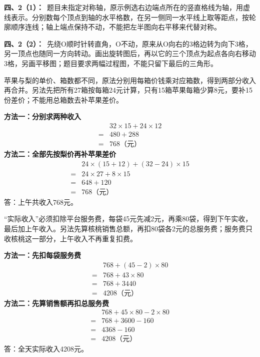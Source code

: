 \documentclass[multi=snippet,border=0pt]{standalone}
\newenvironment{snippet}[3]{\begin{minipage}{#1bp}\color{answerred}\fontsize{#2}{#3}\selectfont\raggedright}{\end{minipage}}
\begin{document}
\begin{snippet}{505}{11.5}{14}\textbf{四、2（1）：}\ 题目未指定对称轴，原示例选右边端点所在的竖直格线为轴，用虚线表示。分别数每个顶点到轴的水平格数，在另一侧同一水平线上取等距点，按轮廓顺序连线；轴上端点保持不动，不能把左半图向右平移来代替对称。\end{snippet}
\begin{snippet}{505}{11.5}{14}\textbf{四、2（2）：}\ 先绕O顺时针转直角，O不动，原来从O向右的3格边转为向下3格，另一顶点也随同一方向转动。画出旋转图后，再以它的三个顶点为起点各向右移动3格，另画平移图；题目要求两幅过程图，不能只留下最后的三角形。\end{snippet}
\begin{snippet}{505}{11.5}{14}苹果与梨的单价、箱数都不同，原法分别用每箱价钱乘对应箱数，得到两部分收入再合并。另法先把所有27箱按每箱24元计算，只有15箱苹果每箱少算8元，要补15份差价；不能用总箱数去补苹果差价。\par \textbf{方法一：分别求两种收入}\[\begin{aligned} &32\times15+24\times12\\={}&480+288\\={}&768\text{（元）}\end{aligned}\]\textbf{方法二：全部先按梨价再补苹果差价}\[\begin{aligned} &24\times(15+12)+(32-24)\times15\\={}&24\times27+8\times15\\={}&648+120\\={}&768\text{（元）}\end{aligned}\]答：上午共收入768元。\end{snippet}
\begin{snippet}{505}{11.5}{14}“实际收入”必须扣除平台服务费，每袋45元先减2元，再乘80袋，得到下午实收，最后加上午收入。另法先算核桃销售总额，再扣80袋各2元的总服务费；服务费只收核桃这一部分，上午收入不再重复扣费。\par \textbf{方法一：先扣每袋服务费}\[\begin{aligned} &768+(45-2)\times80\\={}&768+43\times80\\={}&768+3440\\={}&4208\text{（元）}\end{aligned}\]\textbf{方法二：先算销售额再扣总服务费}\[\begin{aligned} &768+45\times80-2\times80\\={}&768+3600-160\\={}&4368-160\\={}&4208\text{（元）}\end{aligned}\]答：全天实际收入4208元。\end{snippet}
\end{document}
